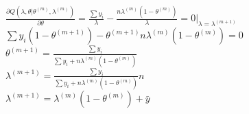 \documentclass{article}\usepackage[]{graphicx}\usepackage[]{color}
\begin{document}
$\frac{\partial Q(\lambda,\theta|\theta^{(m)},\lambda^{(m)})}{\partial \theta}=\frac{\sum y_{i}}{\lambda}-\frac{n\lambda^{(m)}(1-\theta^{(m)})}{\lambda}=0|_{\lambda=\lambda^(m+1)}$\\

$\sum y_{i}(1-\theta^{(m+1)})-\theta^{(m+1)}n\lambda^{(m)}(1-\theta^{(m)})=0$\\


$\theta^{(m+1)}=\frac{\sum y_{i}}{\sum y_{i}+n\lambda^{(m)}(1-\theta^{(m)})}$\\

$\lambda^{(m+1)}=\frac{\sum y_{i}}{\sum y_{i}+n\lambda^{(m)}(1-\theta^{(m)})}{n}$\\

$\lambda^{(m+1)}=\lambda^{(m)}(1-\theta^{(m)})+\bar{y}$\\
\end{document}
